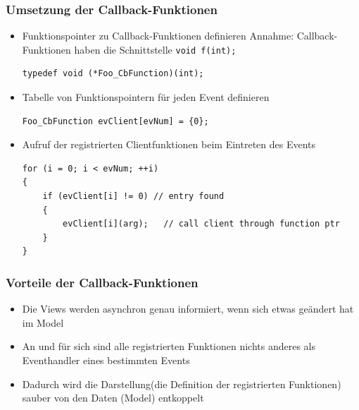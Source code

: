 \subsubsection{Umsetzung der Callback-Funktionen}
\begin{itemize}
	\item Funktionspointer zu Callback-Funktionen definieren Annahme: Callback-Funktionen haben die Schnittstelle \lstinline[style=C]{void f(int);}
	\begin{lstlisting}[style=C]
typedef void (*Foo_CbFunction)(int);
	\end{lstlisting}
	
	\item Tabelle von Funktionspointern für jeden Event definieren
	\begin{lstlisting}[style=C]
Foo_CbFunction evClient[evNum] = {0};
	\end{lstlisting}
	
	\item Aufruf der registrierten Clientfunktionen beim Eintreten des Events
	\begin{lstlisting}[style=C]
for (i = 0; i < evNum; ++i) 
{ 
	if (evClient[i] != 0) // entry found 
	{ 
		evClient[i](arg);   // call client through function ptr 
	}                       
}
	\end{lstlisting}
	
\end{itemize}

\subsubsection{Vorteile der Callback-Funktionen}
\begin{itemize}
	\item Die Views werden asynchron genau informiert, wenn sich etwas geändert hat im Model
	\item An und für sich sind alle registrierten Funktionen nichts anderes als Eventhandler eines bestimmten Events
	\item Dadurch wird die Darstellung(die Definition der registrierten Funktionen) sauber von den Daten (Model) entkoppelt
\end{itemize} 

